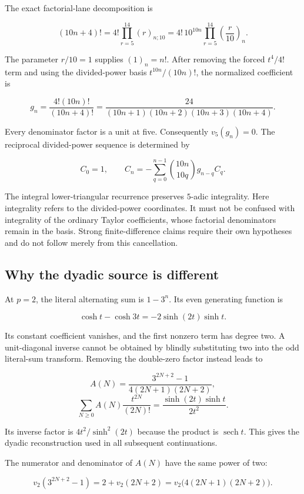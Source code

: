 \documentclass[11pt,letterpaper]{article}
\begin{document}
The exact factorial-lane decomposition is

\[
(10n+4)!=4!\prod_{r=5}^{14}(r)_{n;10}
=4!\,10^{10n}\prod_{r=5}^{14}\left(\frac r{10}\right)_n.
\]

The parameter \(r/10=1\) supplies \((1)_n=n!\). After removing the forced \(t^4/4!\) term and using the divided-power basis \(t^{10n}/(10n)!\), the normalized coefficient is

\[
g_n=\frac{4!(10n)!}{(10n+4)!}
=\frac{24}{(10n+1)(10n+2)(10n+3)(10n+4)}.
\]

Every denominator factor is a unit at five. Consequently \(v_5(g_n)=0\). The reciprocal divided-power sequence is determined by

\[
C_0=1,\qquad
C_n=-\sum_{q=0}^{n-1}\binom{10n}{10q}g_{n-q}C_q.
\]

The integral lower-triangular recurrence preserves \(5\)-adic integrality. Here integrality refers to the divided-power coordinates. It must not be confused with integrality of the ordinary Taylor coefficients, whose factorial denominators remain in the basis. Strong finite-difference claims require their own hypotheses and do not follow merely from this cancellation.

\subsection{Why the dyadic source is different}\label{why-the-dyadic-source-is-different}

At \(p=2\), the literal alternating sum is \(1-3^n\). Its even generating function is

\[
\cosh t-\cosh3t=-2\sinh(2t)\sinh t.
\]

Its constant coefficient vanishes, and the first nonzero term has degree two. A unit-diagonal inverse cannot be obtained by blindly substituting two into the odd literal-sum transform. Removing the double-zero factor instead leads to

\[
A(N)=\frac{3^{2N+2}-1}{4(2N+1)(2N+2)},
\] \[
\sum_{N\ge0}A(N)\frac{t^{2N}}{(2N)!}
=\frac{\sinh(2t)\sinh t}{2t^2}.
\]

Its inverse factor is \(4t^2/\sinh^2(2t)\) because the product is \(\operatorname{sech}t\). This gives the dyadic reconstruction used in all subsequent continuations.

The numerator and denominator of \(A(N)\) have the same power of two:

\[
v_2(3^{2N+2}-1)=2+v_2(2N+2)
=v_2\bigl(4(2N+1)(2N+2)\bigr).
\]
\end{document}
